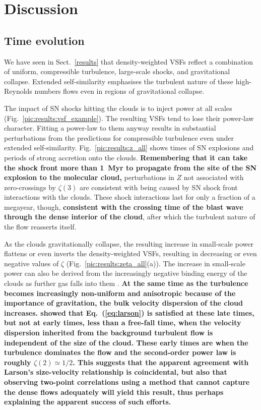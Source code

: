 \section{Discussion}\label{discussion}

\subsection{Time evolution}\label{discussion:normal}

We have seen in Sect.~\ref{results} that density-weighted VSFs reflect a combination of uniform, compressible turbulence, large-scale shocks, and gravitational collapse.  Extended self-similarity emphasises the turbulent nature of these high-Reynolds numbers flows even in regions of gravitational collapse. 

The impact of SN shocks hitting the clouds is to inject power at all scales (Fig.~\ref{pic:results:vsf_example}). 
The resulting VSFs tend to lose their power-law character. Fitting a power-law to them anyway results in substantial perturbations from the predictions for compressible turbulence even under extended self-similarity.
Fig.~\ref{pic:results:z_all} shows times of SN explosions and periods of strong accretion onto the clouds. 
\textbf{Remembering that it can take the shock front more than 1~Myr to propagate from the site of the SN explosion to the molecular cloud,} perturbations in $Z$ not associated with zero-crossings by $\zeta(3)$ are consistent with being caused by SN shock front interactions with the clouds.  
These shock interactions last for only a fraction of a megayear, though, 
\textbf{consistent with the crossing time of the blast wave through the dense interior of the cloud}, after which the turbulent nature of the flow reasserts itself.

As the clouds gravitationally collapse, the resulting increase in small-scale power flattens or even inverts the density-weighted VSFs, resulting in decreasing or even negative values of $\zeta$ (Fig.~\ref{pic:results:zeta_all}(a)). The increase in small-scale power can also be derived from the increasingly negative binding energy of the clouds as further gas falls into them . 
\textbf{
At the same time as the turbulence becomes increasingly non-uniform and anisotropic because of the importance of gravitation, the bulk velocity dispersion of the cloud increases.
 showed that Eq.~(\ref{eq:larson}) is satisfied at these late times, but not at early times, less than a free-fall time, when the velocity dispersion inherited from the background turbulent flow is independent of the size of the cloud. 
These early times are when the turbulence dominates the flow and the second-order power law is roughly $\zeta(2) \simeq 1/2$.
This suggests that the apparent agreement with Larson's size-velocity relationship is coincidental, but also that observing two-point correlations using a method that cannot capture the dense flows adequately will yield this result, thus perhaps explaining the apparent success of such efforts.
}

